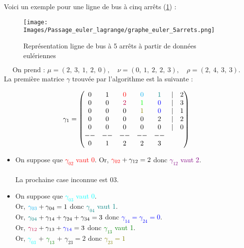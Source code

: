 \documentclass[12pt]{article}
\begin{document}
Voici un exemple pour une ligne de bus à cinq arrêts (\ref{fig:graphe_5arrets}) :\\
\begin{figure}[H]
    \centering
    \texttt{[image: Images/Passage\_euler\_lagrange/graphe\_euler\_5arrets.png]}
    \caption{Représentation ligne de bus à 5 arrêts à partir de données eulériennes}
    \label{fig:graphe_5arrets}
\end{figure}
\[ \text{On prend : }
\mu = (2,\:3,\:1,\:2,\:0), \quad \nu = (0,\:1,\:2,\:2,\:3), \quad \rho = (2,\:4,\:3,\:3).
\]
La première matrice $\gamma$ trouvée par l'algorithme est la suivante :\\
\begin{minipage}{.1\textwidth}%
\begin{adjustwidth}{-2cm}{-1cm}

 \[\gamma_1 = 
\begin{pmatrix}
0 & 1 & \textcolor{red}{0} & \textcolor{cyan}{0} & \textcolor{teal}{1} & | & 2 \\
0 & 0 & \textcolor{purple}{2} & \textcolor{green}{1} & \textcolor{blue}{0} & | & 3 \\
0 & 0 & 0 & \textcolor{olive}{1} & \textcolor{blue}{0}& | & 1\\
0 & 0 & 0 & 0 & 2 & | &  2\\
0 & 0 & 0 & 0 & 0 & | &  0\\
--&--&--&--&--\\
0 & 1 & 2 & 2 & 3 
\end{pmatrix}\]
\end{adjustwidth}
\end{minipage}%
\hfill
\begin{minipage}{0.6\textwidth}%
\begin{itemize}
    \item On suppose que \textcolor{red}{$\gamma_{02}$ vaut 0}. Or, $\textcolor{red}{\gamma_{02}} + \gamma_{12} = 2$ donc \textcolor{purple}{$\gamma_{12}$ vaut 2}.\\
    \\
    La prochaine case inconnue est 03.
    \item On suppose que \textcolor{cyan}{$\gamma_{03}$ vaut 0}.\\
    Or, $\textcolor{cyan}{\gamma_{03}} + \gamma_{04} = 1 $ donc \textcolor{teal}{$\gamma_{04}$ vaut 1}.\\
    Or, $\textcolor{teal}{\gamma_{04}} + \gamma_{14} + \gamma_{24} + \gamma_{34} = 3$ donc \textcolor{blue}{$\gamma_{14} = \gamma_{24} = 0$}.\\
    Or, $\textcolor{purple}{\gamma_{12}} + \gamma_{13} + \textcolor{blue}{\gamma_{14}} = 3$ donc \textcolor{green}{$\gamma_{13}$ vaut 1}.\\
    Or, \textcolor{cyan}{$\gamma_{03}$} + \textcolor{green}{$\gamma_{13}$} + $\gamma_{23} = 2$ donc \textcolor{olive}{$\gamma_{23} = 1$}
\end{itemize}
\end{minipage}%
\end{document}
